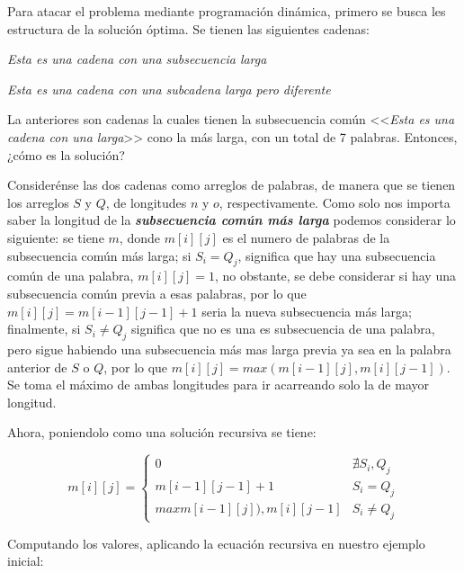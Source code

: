 \documentclass[12pt,twoside]{article}
\begin{document}
Para atacar el problema mediante programaci\'on din\'amica, primero se busca les estructura de la soluci\'on \'optima. Se tienen las siguientes cadenas:

\quad \textit{Esta es una cadena con una subsecuencia larga}


\quad \textit{Esta es una cadena con una subcadena larga pero diferente}

La anteriores son cadenas la cuales tienen la subsecuencia com\'un <<\textit{Esta es una cadena con una larga}>> cono la m\'as larga, con un total de 7 palabras. Entonces, ¿c\'omo es la soluci\'on? 

Consider\'ense las dos cadenas como arreglos de palabras, de manera que se tienen los arreglos $S$ y $Q$, de longitudes $n$ y $o$, respectivamente. Como solo nos importa saber la longitud de la \textit{\textbf{subsecuencia com\'un m\'as larga}} podemos considerar lo siguiente: se tiene $m$, donde $m[i][j]$ es el numero de palabras de la subsecuencia com\'un m\'as larga; si $S_i = Q_j$, significa que hay una subsecuencia com\'un de una palabra, $m[i][j] = 1$, no obstante, se debe considerar si hay una subsecuencia com\'un previa a esas palabras, por lo que $m[i][j] = m[i-1][j-1] + 1$ seria la nueva subsecuencia m\'as larga; finalmente, si $S_i \ne Q_j$ significa que no es una es subsecuencia de una palabra, pero sigue habiendo una subsecuencia m\'as mas larga previa ya sea en la palabra anterior de $S$ o $Q$, por lo que $m[i][j] = max(m[i-1][j], m[i][j-1])$. Se toma el m\'aximo de ambas longitudes para ir acarreando solo la de mayor longitud.

Ahora, poniendolo como una soluci\'on recursiva se tiene:

\[
    m[i][j] = 
    \begin{cases}
    
        0 & \nexists S_i,Q_j \\
        m[i-1][j-1] + 1 & S_i = Q_j \\
        max{m[i-1][j]), m[i][j-1]} & S_i \neq Q_j
    
    \end{cases}
\]

Computando los valores, aplicando la ecuaci\'on recursiva en nuestro ejemplo inicial:
\end{document}
